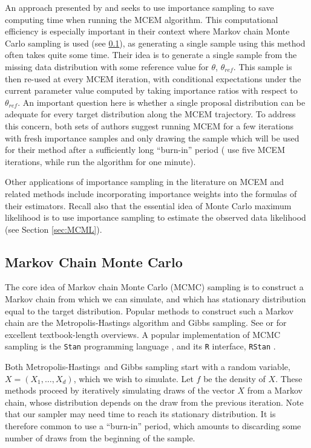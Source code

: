 \documentclass[ss]{imsart}
\theoremstyle{plain}
\theoremstyle{definition}
\theoremstyle{remark}
\newcommand{\mh}{Metropolis-Hastings}
\begin{document}
An approach presented by \citet{Qui99} and \citet{Lev01} seeks to use importance sampling to save computing time when running the MCEM algorithm. This computational efficiency is especially important in their context where Markov chain Monte Carlo sampling is used (see \ref{sec:MCMC}), as generating a single sample using this method often takes quite some time. Their idea is to generate a single sample from the missing data distribution with some reference value for $\theta$, $\theta_{ref}$. This sample is then re-used at every MCEM iteration, with conditional expectations under the current parameter value computed by taking importance ratios with respect to $\theta_{ref}$. An important question here is whether a single proposal distribution can be adequate for every target distribution along the MCEM trajectory. To address this concern, both sets of authors suggest running MCEM for a few iterations with fresh importance samples and only drawing the sample which will be used for their method after a sufficiently long ``burn-in'' period (\citeauthor{Qui99} use five MCEM iterations, while \citeauthor{Lev01} run the algorithm for one minute).

Other applications of importance sampling in the literature on MCEM and related methods include \citet{Caf05} incorporating importance weights into the formulas of their estimators. Recall also that the essential idea of Monte Carlo maximum likelihood is to use importance sampling to estimate the observed data likelihood (see Section \ref{sec:MCML}).


\subsection{Markov Chain Monte Carlo}
\label{sec:MCMC}

The core idea of Markov chain Monte Carlo (MCMC) sampling is to construct a Markov chain from which we can simulate, and which has stationary distribution equal to the target distribution. Popular methods to construct such a Markov chain are the Metropolis-Hastings algorithm and Gibbs sampling. See \citet{Gel13} or \citet{Rob04} for excellent textbook-length overviews. A popular implementation of MCMC sampling is the \texttt{Stan} programming language \citep{Sta22}, and its \texttt{R} interface, \texttt{RStan} \citep{Sta23}.

Both \mh\ and Gibbs sampling start with a random variable, $X = (X_1, \ldots, X_d)$, which we wish to simulate. Let $f$ be the density of $X$. These methods proceed by iteratively simulating draws of the vector $X$ from a Markov chain, whose distribution depends on the draw from the previous iteration. Note that our sampler may need time to reach its stationary distribution. It is therefore common to use a ``burn-in'' period, which amounts to discarding some number of draws from the beginning of the sample.
\end{document}
